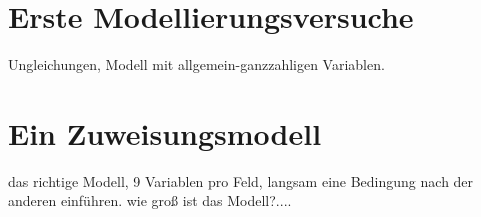 \section{Erste Modellierungsversuche}
Ungleichungen, Modell mit allgemein-ganzzahligen Variablen.

\section{Ein Zuweisungsmodell}
das richtige Modell, 9 Variablen pro Feld, langsam eine Bedingung nach
der anderen einführen. wie groß ist das Modell?....

